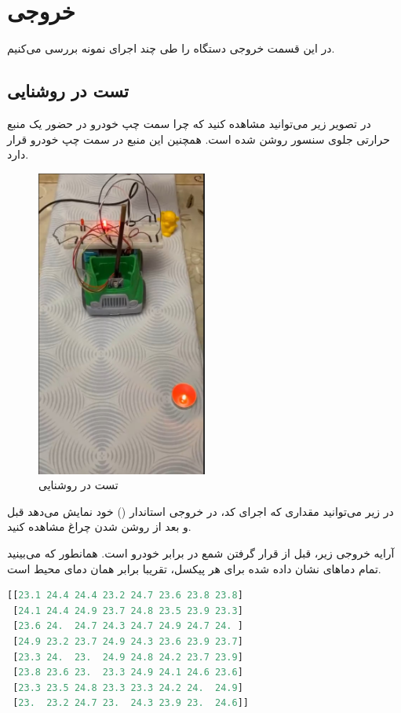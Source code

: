 \chapter{خروجی}
در این قسمت خروجی دستگاه را طی چند اجرای نمونه بررسی ‌می‌کنیم.

\section{تست در روشنایی}

در تصویر زیر می‌توانید مشاهده کنید که چرا سمت چپ خودرو در حضور یک منبع حرارتی جلوی سنسور روشن شده است. همچنین این منبع در سمت چپ خودرو قرار دارد. 

\begin{figure}[H]
	\centering
	\includegraphics[width=0.5\textwidth]{figs/test_with_lights_on.jpg}
	\caption{تست در روشنایی}
	\label{fig:2}
\end{figure}

در زیر می‌توانید مقداری که اجرای کد، در خروجی استاندار () خود نمایش می‌دهد قبل و بعد از روشن شدن چراغ مشاهده کنید.


آرایه خروجی زیر، قبل از قرار گرفتن شمع در برابر خودرو است. همانطور که می‌بینید تمام دماها‌ی نشان داده شده برای هر پیکسل، تقریبا برابر همان دمای محیط است.
\begin{latin}
\begin{lstlisting}[language=python]
[[23.1 24.4 24.4 23.2 24.7 23.6 23.8 23.8]
 [24.1 24.4 24.9 23.7 24.8 23.5 23.9 23.3]
 [23.6 24.  24.7 24.3 24.7 24.9 24.7 24. ]
 [24.9 23.2 23.7 24.9 24.3 23.6 23.9 23.7]
 [23.3 24.  23.  24.9 24.8 24.2 23.7 23.9]
 [23.8 23.6 23.  23.3 24.9 24.1 24.6 23.6]
 [23.3 23.5 24.8 23.3 23.3 24.2 24.  24.9]
 [23.  23.2 24.7 23.  24.3 23.9 23.  24.6]]
\end{lstlisting}
\end{latin}


